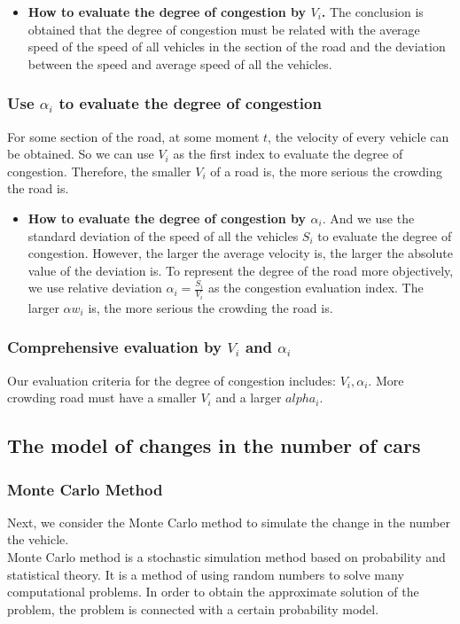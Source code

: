 \documentclass{mcmthesis}
\begin{document}
\begin{itemize}
\item{\textbf{How to evaluate the degree of congestion by $V_{i}$.} The conclusion is obtained that the degree of congestion must be related with the average speed of the speed of all vehicles in the section of the road and the deviation between the speed and average speed of all the vehicles.}
\end{itemize}

\subsubsection{Use $\alpha_{i}$ to evaluate the degree of congestion}
\indent For some section of the road, at some moment $t$, the velocity of every vehicle can be obtained. So we can use $ V_{i} $ as the first index to evaluate the degree of congestion. Therefore, the smaller $V_{i}$ of a road is, the more serious the crowding the road is.

\begin{itemize}
\item{\textbf{How to evaluate the degree of congestion by $\alpha_{i}$}. And we use the standard deviation of the speed of all the vehicles $S_{i}$ to evaluate the degree of congestion. However, the larger the average velocity is, the larger the absolute value of the deviation is. To represent the degree of the road more objectively, we use relative deviation $\alpha_{i} =\frac{S_{i } }{V_{i}} $ as the congestion evaluation index. The larger $\alpha w_{i}$ is, the more serious the crowding the road is.}
\end{itemize}
\subsubsection{Comprehensive evaluation by $V_{i}$ and $\alpha_{i}$}

\indent  Our evaluation criteria for the degree of congestion includes: $V_{i}, \alpha_{i} $. More crowding road must have a smaller $V_{i}$ and a larger $alpha_{i}$.\\

\subsection{The model of changes in the number of cars}
\label{changes of cars}
\subsubsection{Monte Carlo Method}
\indent Next, we consider the Monte Carlo method to simulate the change in the number the vehicle.\\
\indent Monte Carlo method is a stochastic simulation method based on probability and statistical theory. It is a method of using random numbers to solve many computational problems. In order to obtain the approximate solution of the problem, the problem is connected with a certain probability model. \\
\end{document}
